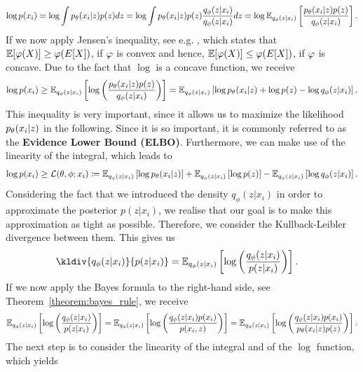 \begin{align}\label{eq:log_evidence}
\log p(x_i) = \log \int p_{\theta}(x_i|z) p(z) dz = \log \int p_{\theta}(x_i|z) p(z) \frac{q_{\phi}(z|x_i)}{q_{\phi}(z|x_i)}dz = \log \operatorname{\mathbb{E}}_{q_{\phi}(z|x_i)} \left[ \frac{p_{\theta}(x_i|z)p(z)}{q_{\phi}(z|x_i)}\right].
\end{align}
If we now apply Jensen's inequality, see e.g. \cite[Theorem~7.9]{klenke2013probability}, which states that $\operatorname{\mathbb{E}}[\operatorname{\varphi}(X)] \geq \operatorname{\varphi}(E[X])$, if $\operatorname{\varphi}$ is convex and hence, $\operatorname{\mathbb{E}}[\operatorname{\varphi}(X)] \leq \operatorname{\varphi}(E[X])$, if $\operatorname{\varphi}$ is concave. Due to the fact that $\log$ is a concave function, we receive
\begin{align*}
\log p(x_i) \geq \operatorname{\mathbb{E}}_{q_{\phi}(z|x_i)} \left[ \log\left(\frac{p_{\theta}(x_i|z)p(z)}{q_{\phi}(z|x_i)}\right)\right] = \operatorname{\mathbb{E}}_{q_{\phi}(z|x_i)} \left[ \log p_{\theta}(x_i|z) + \log p(z) - \log q_{\phi}(z|x_i)\right].
\end{align*}
This inequality is very important, since it allows us to maximize the likelihood $p_{\theta}(x_i|z)$ in the following. Since it is so important, it is commonly referred to as the \textbf{Evidence Lower Bound (ELBO)}. Furthermore, we can make use of the linearity of the integral, which leads to
\begin{align}\label{eq:elbo}
\log p(x_i) \geq \operatorname{\mathcal{L}}(\theta, \phi; x_i) \coloneqq \operatorname{\mathbb{E}}_{q_{\phi}(z|x_i)} \left[ \log p_{\theta}(x_i|z) \right] + \operatorname{\mathbb{E}}_{q_{\phi}(z|x_i)} \left[ \log p(z) \right] - \operatorname{\mathbb{E}}_{q_{\phi}(z|x_i)} \left[ \log q_{\phi}(z|x_i)\right].
\end{align}
Considering the fact that we introduced the density $q_{\phi}(z|x_i)$ in order to approximate the posterior $p(z|x_i)$, we realise that our goal is to make this approximation as tight as possible. Therefore, we consider the Kullback-Leibler divergence between them. This gives us
\begin{align*}
\kldiv{q_{\phi}(z|x_i)}{p(z|x_i)} &= \E_{q_{\phi}(z|x_i)} \left[ \log \left( \frac{q_{\phi}(z|x_i)}{p(z|x_i)} \right) \right].
\end{align*}
If we now apply the Bayes formula to the right-hand side, see Theorem~\ref{theorem:bayes_rule}, we receive
\begin{align*}
\operatorname{\mathbb{E}}_{q_{\phi}(z|x_i)} \left[ \log \left( \frac{q_{\phi}(z|x_i)}{p(z|x_i)} \right) \right]  = \operatorname{\mathbb{E}}_{q_{\phi}(z|x_i)} \left[ \log \left( \frac{q_{\phi}(z|x_i)p(x_i)}{p(x_i, z)} \right) \right] = \operatorname{\mathbb{E}}_{q_{\phi}(z|x_i)} \left[ \log \left( \frac{q_{\phi}(z|x_i)p(x_i)}{p_{\theta}(x_i| z)p(z)} \right) \right].
\end{align*}
The next step is to consider the linearity of the integral and of the $\log$ function, which yields

